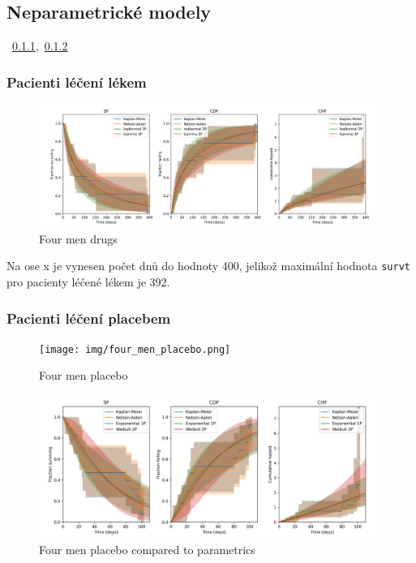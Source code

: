 \documentclass[a4, 11pt]{article}
\theoremstyle{definition}
\theoremstyle{remark}
\begin{document}
	\subsection{Neparametrické modely}
	~\ref{sec:non_parametric_drugs},~\ref{sec:non_parametric_placebo}
	
	\subsubsection{Pacienti léčení lékem} \label{sec:non_parametric_drugs}
	
	\begin{figure}[H]
		\centering
		\includegraphics[width=0.9\linewidth]{img/four_men_drugs.png}
		\caption{Four men drugs}
		\label{fig:four_men_drugs}
	\end{figure}

	Na ose x je vynesen počet dnů do hodnoty 400, jelikož maximální hodnota \texttt{survt} pro pacienty léčené lékem je 392.
	
	\subsubsection{Pacienti léčení placebem} \label{sec:non_parametric_placebo}
	
	\begin{figure}[H]
		\centering
		\texttt{[image: img/four\_men\_placebo.png]}
		\caption{Four men placebo}
		\label{fig:four_men_placebo}
	\end{figure}

	\begin{figure}[H]
	\centering
	\includegraphics[width=0.9\linewidth]{img/four_men_placebo_compared_to_parametrics.png}
	\caption{Four men placebo compared to parametrics}
	\label{fig:four_men_placebo}
\end{figure}
	
\end{document}
